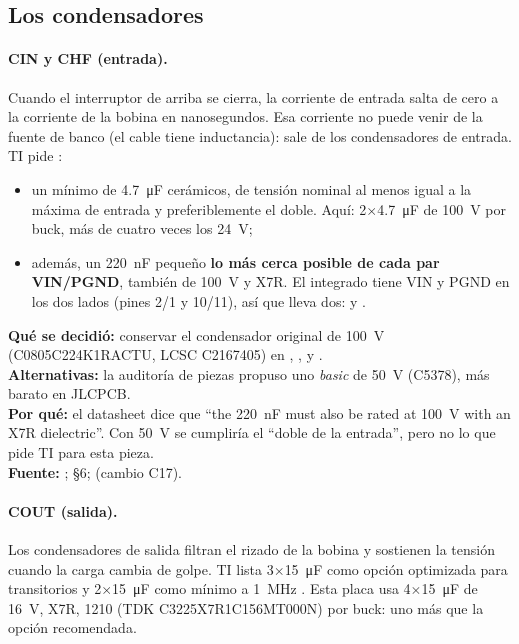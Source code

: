 \subsection{Los condensadores}\label{sec:c02-cond}

\paragraph{CIN y CHF (entrada).} Cuando el interruptor de arriba se cierra, la corriente de entrada salta de cero a la corriente de la bobina en nanosegundos. Esa corriente no puede venir de la fuente de banco (el cable tiene inductancia): sale de los condensadores de entrada. TI pide :
\begin{itemize}
  \item un mínimo de \SI{4.7}{\micro\farad} cerámicos, de tensión nominal al menos igual a la máxima de entrada y preferiblemente el doble. Aquí: 2$\times$\SI{4.7}{\micro\farad} de \SI{100}{\volt} por buck, más de cuatro veces los \SI{24}{\volt};
  \item además, un \SI{220}{\nano\farad} pequeño \textbf{lo más cerca posible de cada par VIN/PGND}, también de \SI{100}{\volt} y X7R. El integrado tiene VIN y PGND en los dos lados (pines 2/1 y 10/11), así que lleva dos:  y .
\end{itemize}

\begin{decision}
\textbf{Qué se decidió:} conservar el condensador original de \SI{100}{\volt} (C0805C224K1RACTU, LCSC C2167405) en , ,  y .\\
\textbf{Alternativas:} la auditoría de piezas propuso uno \emph{basic} de \SI{50}{\volt} (C5378), más barato en JLCPCB.\\
\textbf{Por qué:} el datasheet dice que ``the \SI{220}{\nano\farad} must also be rated at \SI{100}{\volt} with an X7R dielectric''. Con \SI{50}{\volt} se cumpliría el ``doble de la entrada'', pero no lo que pide TI para esta pieza.\\
\textbf{Fuente:} ;  §6;  (cambio C17).
\end{decision}

\paragraph{COUT (salida).} Los condensadores de salida filtran el rizado de la bobina y sostienen la tensión cuando la carga cambia de golpe. TI lista 3$\times$\SI{15}{\micro\farad} como opción optimizada para transitorios y 2$\times$\SI{15}{\micro\farad} como mínimo a \SI{1}{\mega\hertz} . Esta placa usa 4$\times$\SI{15}{\micro\farad} de \SI{16}{\volt}, X7R, 1210 (TDK C3225X7R1C156MT000N) por buck: uno más que la opción recomendada.

